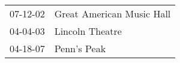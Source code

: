\begin{supertabular}{p{0.07\textwidth}p{0.23\textwidth}}
 07-12-02 &  Great American Music Hall \\
 04-04-03 &            Lincoln Theatre \\
 04-18-07 &                Penn's Peak \\
\end{supertabular}
